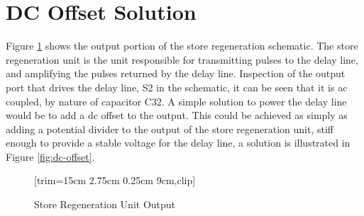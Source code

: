 \section{DC Offset Solution} \label{sec:power-dc-offset}
Figure \ref{fig:store-regen-output} shows the output portion of the store regeneration schematic. The store regeneration unit is the unit responsible for transmitting pulses to the delay line, and amplifying the pulses returned by the delay line. Inspection of the output port that drives the delay line, S2 in the schematic, it can be seen that it is \gls{ac} coupled, by nature of capacitor C32. A simple solution to power the delay line would be to add a \gls{dc} offset to the output. This could be achieved as simply as adding a potential divider to the output of the store regeneration unit, stiff enough to provide a stable voltage for the delay line, a solution is illustrated in Figure \ref{fig:dc-offset}.

\begin{figure}[ht]
	\centering
	[trim={15cm 2.75cm 0.25cm 9cm},clip] %
	\caption{Store Regeneration Unit Output \cite{burton2014b}}
	\label{fig:store-regen-output}
\end{figure}



